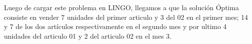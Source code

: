 
\begin{homeworkProblem}[-1][MKJ]
Luego de cargar este problema en LINGO, llegamos a que la solución Óptima consiste en vender 7 unidades del primer articulo y 3 del 02 en el primer mes; 14 y 7 de los dos artículos respectivamente en el segundo mes y por ultimo 4 unidades del articulo 01 y 2 del articulo 02 en el mes 3.
\end{homeworkProblem}


